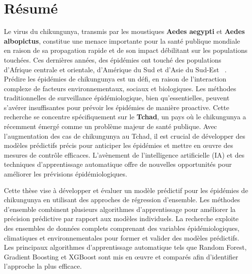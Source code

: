 \chapter*{Résumé}

\renewcommand{\abstractnamefont}{\normalfont\Large\bfseries}

\hskip7mm

\begin{spacing}{1.3}

 



\end{spacing}
Le virus du chikungunya, transmis par les moustiques \textbf{Aedes aegypti}  et \textbf{Aedes albopictus}, constitue une menace importante pour la santé publique mondiale en raison de sa propagation rapide et de son impact débilitant sur les populations touchées. Ces dernières années, des épidémies ont touché des populations d'Afrique centrale et orientale, d'Amérique du Sud et d'Asie du Sud-Est ~\cite{intro}. Prédire les épidémies de chikungunya est un défi, en raison de l'interaction complexe de facteurs environnementaux, sociaux et biologiques. Les méthodes traditionnelles de surveillance épidémiologique, bien qu'essentielles, peuvent s'avérer insuffisantes pour prévoir les épidémies de manière proactive. Cette recherche se concentre spécifiquement sur le \textbf{Tchad}, un pays où le chikungunya a récemment émergé comme un problème majeur de santé publique. Avec l'augmentation des cas de chikungunya au Tchad, il est crucial de développer des modèles prédictifs précis pour anticiper les épidémies et mettre en œuvre des mesures de contrôle efficaces. L'avènement de l'intelligence artificielle (IA) et des techniques d'apprentissage automatique offre de nouvelles opportunités pour améliorer les prévisions épidémiologiques.

Cette thèse vise à développer et évaluer un modèle prédictif pour les épidémies de chikungunya en utilisant des approches de régression d'ensemble. Les méthodes d'ensemble combinent plusieurs algorithmes d'apprentissage pour améliorer la précision prédictive par rapport aux modèles individuels. La recherche exploite des ensembles de données complets comprenant des variables épidémiologiques, climatiques et environnementales pour former et valider des modèles prédictifs. Les principaux algorithmes d'apprentissage automatique tels que Random Forest, Gradient Boosting et XGBoost sont mis en œuvre et comparés afin d'identifier l'approche la plus efficace.

